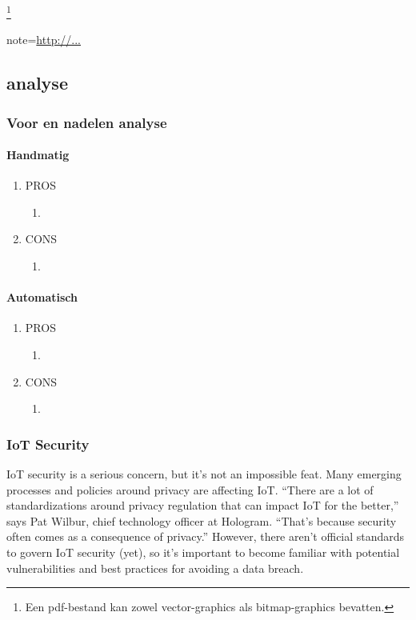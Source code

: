 \footnote{Een pdf-bestand kan zowel vector-graphics als
	bitmap-graphics bevatten.}



note={\url{http://...}}

 


\subsection{analyse}


\subsubsection{Voor en nadelen analyse}

\paragraph{Handmatig}
\begin{enumerate}
	\item PROS
	\begin{enumerate}
		\item
	\end{enumerate}
	\item CONS
	\begin{enumerate}
		\item
	\end{enumerate}
\end{enumerate}

\paragraph{Automatisch}
\begin{enumerate}
	\item PROS
	\begin{enumerate}
		\item
	\end{enumerate}
	\item CONS
	\begin{enumerate}
		\item
	\end{enumerate}
\end{enumerate}
 



\subsubsection{IoT Security}
IoT security is a serious concern, but it’s not an impossible feat. Many emerging processes and policies around privacy are affecting IoT.
“There are a lot of standardizations around privacy regulation that can impact IoT for the better,” says Pat Wilbur, chief technology officer at Hologram. “That’s because security often comes as a consequence of privacy.”
However, there aren’t official standards to govern IoT security (yet), so it’s important to become familiar with potential vulnerabilities and best practices for avoiding a data breach.

